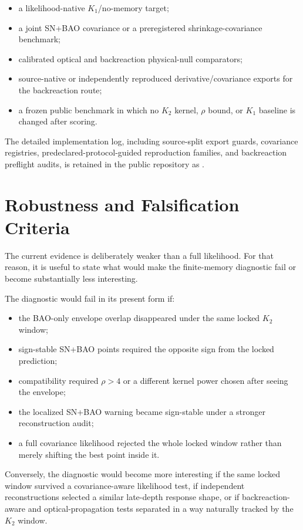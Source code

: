 \documentclass[11pt]{article}
\begin{document}
\begin{itemize}
\item a likelihood-native $K_1$/no-memory target;
\item a joint SN+BAO covariance or a preregistered shrinkage-covariance benchmark;
\item calibrated optical and backreaction physical-null comparators;
\item source-native or independently reproduced derivative/covariance exports for the backreaction route;
\item a frozen public benchmark in which no $K_2$ kernel, $\rho$ bound, or $K_1$ baseline is changed after scoring.
\end{itemize}

The detailed implementation log, including source-split export guards,
covariance registries, predeclared-protocol-guided reproduction families, and
backreaction preflight audits, is retained in the public repository as
.

\section{Robustness and Falsification Criteria}

The current evidence is deliberately weaker than a full likelihood. For that
reason, it is useful to state what would make the finite-memory diagnostic fail
or become substantially less interesting.

The diagnostic would fail in its present form if:

\begin{itemize}
\item the BAO-only envelope overlap disappeared under the same locked $K_2$ window;
\item sign-stable SN+BAO points required the opposite sign from the locked prediction;
\item compatibility required $\rho > 4$ or a different kernel power chosen after seeing the envelope;
\item the localized SN+BAO warning became sign-stable under a stronger reconstruction audit;
\item a full covariance likelihood rejected the whole locked window rather than merely shifting the best point inside it.
\end{itemize}

Conversely, the diagnostic would become more interesting if the same locked
window survived a covariance-aware likelihood test, if independent
reconstructions selected a similar late-depth response shape, or if
backreaction-aware and optical-propagation tests separated in a way naturally
tracked by the $K_2$ window.
\end{document}
